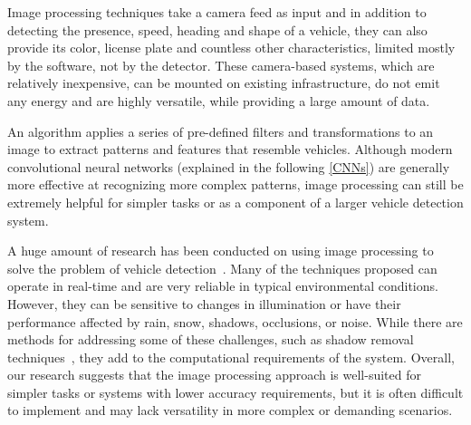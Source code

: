
Image processing techniques take a camera feed as input and in addition to
detecting the presence, speed, heading and shape of a vehicle, they can also
provide its color, license plate and countless other characteristics, limited
mostly by the software, not by the detector. These camera-based systems, which
are relatively inexpensive, can be mounted on existing infrastructure, do not
emit any energy and are highly versatile, while providing a large amount of
data.

An algorithm applies a series of pre-defined filters and transformations to an
image to extract patterns and features that resemble vehicles. Although modern
convolutional neural networks (explained in the following \autoref{CNNs}) are
generally more effective at recognizing more complex patterns, image processing
can still be extremely helpful for simpler tasks or as a component of a larger
vehicle detection system.

A huge amount of research has been conducted on using image processing to solve
the problem of vehicle detection~\cite{ImageProcessingOverview}. Many of the
techniques proposed can operate in real-time and are very reliable in typical
environmental conditions. However, they can be sensitive to changes in
illumination or have their performance affected by rain, snow, shadows,
occlusions, or noise. While there are methods for addressing some of these
challenges, such as shadow removal techniques~\cite{ShadowRemoval}, they add to
the computational requirements of the system. Overall, our research suggests
that the image processing approach is well-suited for simpler tasks or systems
with lower accuracy requirements, but it is often difficult to implement and may
lack versatility in more complex or demanding scenarios.





